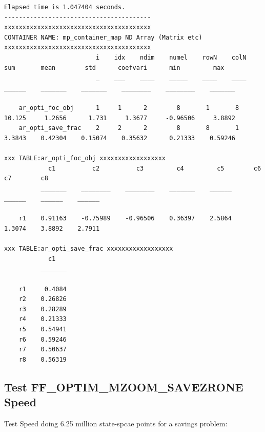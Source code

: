 \documentclass[
]{book}
\begin{document}
\begin{verbatim}
Elapsed time is 1.047404 seconds.
----------------------------------------
xxxxxxxxxxxxxxxxxxxxxxxxxxxxxxxxxxxxxxxx
CONTAINER NAME: mp_container_map ND Array (Matrix etc)
xxxxxxxxxxxxxxxxxxxxxxxxxxxxxxxxxxxxxxxx
                         i    idx    ndim    numel    rowN    colN     sum       mean        std      coefvari      min         max  
                         _    ___    ____    _____    ____    ____    ______    _______    _______    ________    ________    _______

    ar_opti_foc_obj      1     1      2        8       1       8      10.125     1.2656      1.731     1.3677     -0.96506     3.8892
    ar_opti_save_frac    2     2      2        8       8       1      3.3843    0.42304    0.15074    0.35632      0.21333    0.59246

xxx TABLE:ar_opti_foc_obj xxxxxxxxxxxxxxxxxx
            c1          c2          c3         c4         c5        c6        c7        c8  
          _______    ________    ________    _______    ______    ______    ______    ______

    r1    0.91163    -0.75989    -0.96506    0.36397    2.5864    1.3074    3.8892    2.7911

xxx TABLE:ar_opti_save_frac xxxxxxxxxxxxxxxxxx
            c1   
          _______

    r1     0.4084
    r2    0.26826
    r3    0.28289
    r4    0.21333
    r5    0.54941
    r6    0.59246
    r7    0.50637
    r8    0.56319
\end{verbatim}

\hypertarget{test-ff_optim_mzoom_savezrone-speed}{%
\subsection{Test FF\_OPTIM\_MZOOM\_SAVEZRONE Speed}\label{test-ff_optim_mzoom_savezrone-speed}}

Test Speed doing 6.25 million state-spcae points for a savings problem:
\end{document}
